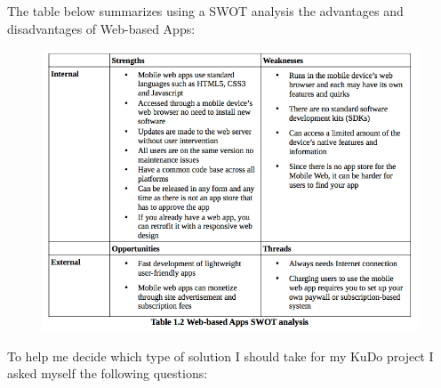 \documentclass[a4paper,12pt]{book}
\begin{document}
\newpage

The table below summarizes using a SWOT analysis the advantages and disadvantages of Web-based Apps:

\begin{figure}[H]
    \centering
    \includegraphics[width=13cm, keepaspectratio]{img/table12.png}
 \end{figure}

To help me decide which type of solution I should take for my KuDo project I asked myself the following questions:
\end{document}
